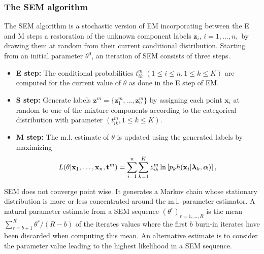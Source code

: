 \documentclass[a4paper,10pt]{article}
\newcommand{\bx}{\mathbf{x}}
\newcommand{\bz}{\mathbf{z}}
\newcommand{\bt}{\mathbf{t}}
\newcommand{\balpha}{\boldsymbol{\alpha}}
\newcommand{\blambda}{\boldsymbol{\lambda}}
\begin{document}
\subsubsection{The SEM algorithm}\label{subsubsec:SEM}
The SEM algorithm is a stochastic version of EM incorporating between the E and M steps a
restoration of the unknown component labels $\bz_i$, $i=1,\ldots,n,$ by drawing them at random
from their current conditional distribution. Starting from an initial parameter $\theta^0$, an
iteration of SEM consists of three steps.
\begin{itemize}
\item {\bf E step:} The conditional probabilities $t^m_{ik}$ $(1 \leq i \leq n, 1 \leq k \leq
  K)$ are computed for the current value of $\theta$ as done in the E step of EM.
\item {\bf S step:} Generate labels ${\bz}^m=\{ {\bz}^m_1,...,{\bz}^m_n\}$
  by assigning each point ${\bx}_i$ at random to one of the mixture
  components according to the categorical distribution with parameter $(t^m_{ik}, 1 \leq k \leq K)$.
\item {\bf M step:} The m.l. estimate of $\theta$ is updated using the generated labels
  by maximizing
\begin{equation} \label{eq:mStepSEM}
  L(\theta| {\bx}_{1},\ldots,{\bx}_{n}, {\bt}^m)
    =\sum_{i=1}^{n}\sum_{k=1}^{K} z_{ik}^m \ln \left [p_{k} h({\bf x}_{i}|\blambda_{k},\balpha)\right],
\end{equation}

\end{itemize}

SEM does not converge point wise.  It generates a Markov chain whose stationary distribution is
more or less concentrated around the m.l. parameter estimator. A natural parameter estimate from
a SEM sequence $(\theta^r)_{r=1, \ldots,R}$ is the mean $\sum_{r=b+1}^R \theta^r/(R-b)$ of the
iterates values where the first $b$ burn-in iterates have been discarded when computing this
mean.  An alternative estimate is to consider the parameter value leading to the highest
likelihood in a SEM sequence.
\end{document}
